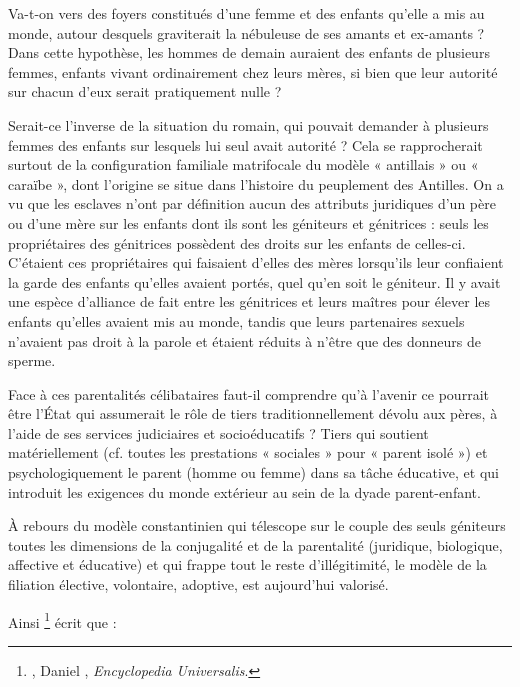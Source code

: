  
 Va-t-on vers des foyers constitués d'une femme et des enfants qu'elle a mis au monde, autour desquels graviterait la nébuleuse de ses amants et ex-amants ? Dans cette hypothèse, les hommes de demain auraient des enfants de plusieurs femmes, enfants vivant ordinairement chez leurs mères, si bien que leur autorité sur chacun d'eux serait pratiquement nulle ? 
 
 Serait-ce l'inverse de la situation du  romain, qui pouvait demander à plusieurs femmes des enfants sur lesquels lui seul avait autorité ? Cela se rapprocherait surtout de la configuration familiale matrifocale du modèle « antillais » ou « caraïbe », dont l'origine se situe dans l'histoire du peuplement des Antilles. On a vu que les esclaves n'ont par définition aucun des attributs juridiques d'un père ou d'une mère sur les enfants dont ils sont les géniteurs et génitrices : seuls les propriétaires des génitrices possèdent des droits sur les enfants de celles-ci. C'étaient ces propriétaires qui faisaient d'elles des mères lorsqu'ils leur confiaient la garde des enfants qu'elles avaient portés, quel qu'en soit le géniteur. Il y avait une espèce d'alliance de fait entre les génitrices et leurs maîtres pour élever les enfants qu'elles avaient mis au monde, tandis que leurs partenaires sexuels n'avaient pas droit à la parole et étaient réduits à n'être que des donneurs de sperme. 

 
 Face à ces parentalités célibataires faut-il comprendre qu'à l'avenir ce pourrait être l'État qui assumerait le rôle de tiers traditionnellement dévolu aux pères, à l'aide de ses services judiciaires et socioéducatifs ? Tiers qui soutient matériellement (cf. toutes les prestations « sociales » pour « parent isolé ») et psychologiquement le parent (homme ou femme) dans sa tâche éducative, et qui introduit les exigences du monde extérieur au sein de la dyade parent-enfant.
 
 À rebours du modèle constantinien qui télescope sur le couple des seuls géniteurs toutes les dimensions de la conjugalité et de la parentalité (juridique, biologique, affective et éducative) et qui frappe tout le reste d'illégitimité, le modèle de la filiation élective, volontaire, adoptive, est aujourd'hui valorisé. 
 
 Ainsi %
\footnote{, Daniel , \emph{Encyclopedia Universalis}.} 
écrit que :

